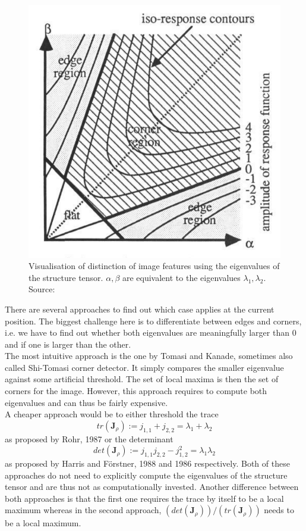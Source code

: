 \begin{figure}[h]
    \centering
    \includegraphics[height=0.25\pdfpageheight]{../Images/structure_tensor.png}
    \caption{Visualisation of distinction of image features using the eigenvalues of the structure
        tensor. $\alpha, \beta$ are equivalent to the eigenvalues $\lambda_1, \lambda_2$. Source: \cite{harris88}}\label{fig:Structure}
\end{figure}
There are several approaches to find out which case applies at the current position. The biggest
challenge here is to differentiate between edges and corners, i.e. we have to find out whether both
eigenvalues are meaningfully larger than 0 and if one is larger than the other.\\
The most intuitive approach is the one by Tomasi and Kanade, sometimes also called Shi-Tomasi
corner detector. It simply compares the smaller eigenvalue against some artificial
threshold. The set of local maxima is then the set of corners for the image\cite{shitomasi94}.
However, this approach requires to compute both eigenvalues and can thus be fairly expensive.\\
A cheaper approach would be to either threshold the trace \[tr(\mathbf{J}_\rho) := j_{1, 1} + j_{2,
        2} = \lambda_1 + \lambda_2\] as proposed by Rohr, 1987 or the determinant \[det(\mathbf{J}_\rho) := j_{1, 1}j_{2, 2} -
    j_{1, 2}^2 = \lambda_1\lambda_2\] as proposed by Harris and F\"orstner, 1988 and 1986
respectively\cite{harris88}. Both of these approaches do not need to explicitly compute the eigenvalues of
the structure tensor and are thus not as computationally invested. Another difference between both 
approaches is that the first one requires the trace by itself to be a local maximum whereas in the
second approach, $(det(\mathbf{J}_\rho))/(tr(\mathbf{J}_\rho))$ needs to be a local maximum.\\

